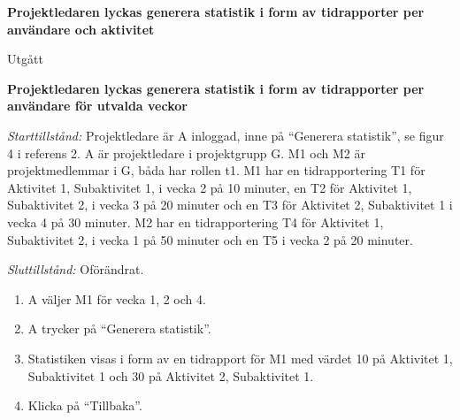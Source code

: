 \documentclass[a4paper]{article}
\begin{document}
\begin{FT}
\item
\textbf{Projektledaren lyckas generera statistik i form av tidrapporter per användare och aktivitet}

Utgått





\item
\textbf{Projektledaren lyckas generera statistik i form av tidrapporter per användare för utvalda veckor}

\emph{Starttillstånd:} Projektledare är A inloggad, inne på ``Generera statistik'', se figur 4 i referens 2. A är projektledare i projektgrupp G. M1 och M2 är projektmedlemmar i G, båda har rollen t1. M1 har en tidrapportering T1 för Aktivitet 1, Subaktivitet 1, i vecka 2 på 10 minuter, en T2 för Aktivitet 1, Subaktivitet 2, i vecka 3 på 20 minuter och en T3 för Aktivitet 2, Subaktivitet 1 i vecka 4 på 30 minuter. M2 har en tidrapportering T4 för Aktivitet 1, Subaktivitet 2, i vecka 1 på 50 minuter och en T5 i vecka 2 på 20 minuter.

\emph{Sluttillstånd:} Oförändrat.

\begin{enumerate}
\item A väljer M1 för vecka 1, 2 och 4.
\item A trycker på ``Generera statistik''.
\item Statistiken visas i form av en tidrapport för M1 med värdet 10 på Aktivitet 1, Subaktivitet 1 och 30 på Aktivitet 2, Subaktivitet 1.
\item Klicka på ``Tillbaka''.
\end{enumerate}



\end{FT}
\end{document}
